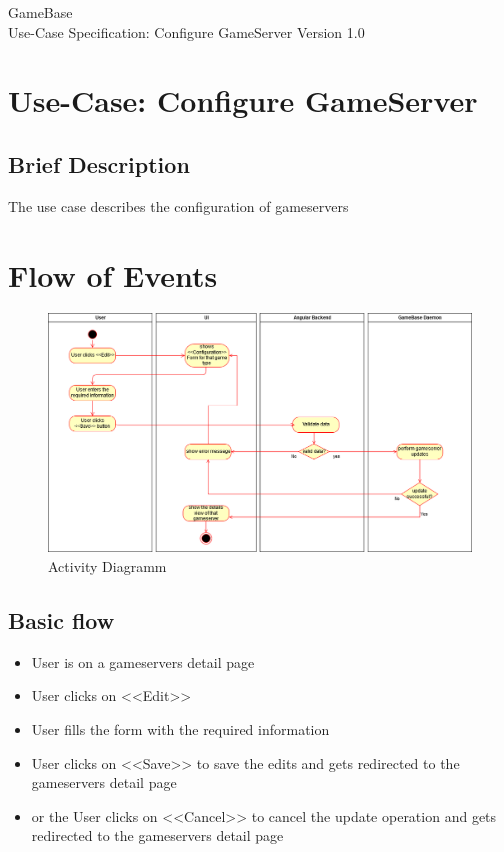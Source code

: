 \documentclass[a4paper,12pt,chapterprefix=false,bibliography=totoc,listof=totoc,]{scrreprt}
\begin{document}
\begin{flushright}
GameBase
\\
Use-Case Specification: Configure GameServer
\bigbreak
Version 1.0
\end{flushright}

\tableofcontents

\chapter{Use-Case: Configure GameServer}

\section{Brief Description}
The use case describes the configuration of gameservers

\chapter{Flow of Events}
\begin{figure}[H]
	\includegraphics[width=\textwidth]{ConfigureGameserverActivityDiagramm.png}
	\caption{Activity Diagramm}
	\label{fig:ad}
\end{figure}

\section{Basic flow}

\begin{itemize}
    \item User is on a gameservers detail page
    \item User clicks on <<Edit>>
    \item User fills the form with the required information
    \item User clicks on <<Save>> to save the edits and gets redirected to the gameservers detail page
    \item or the User clicks on <<Cancel>> to cancel the update operation and gets redirected to the gameservers detail page
\end{itemize}
\end{document}
